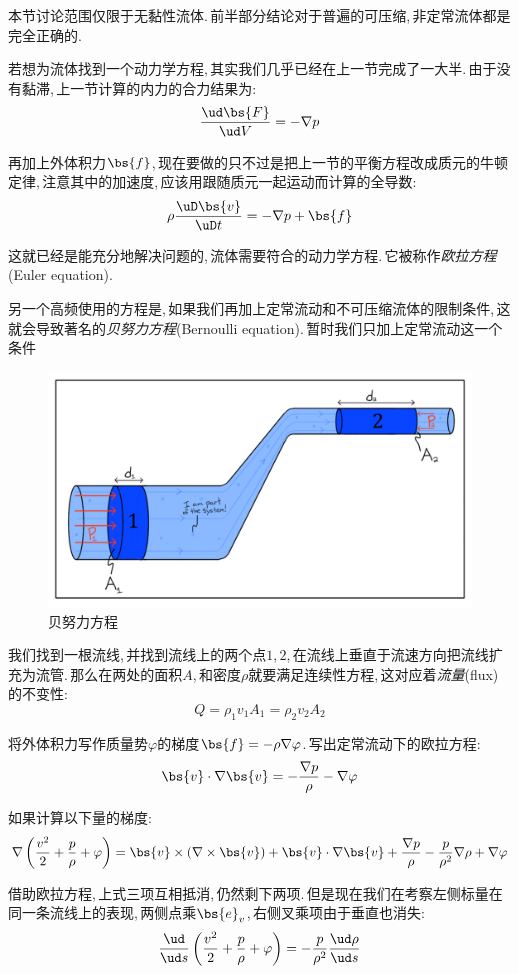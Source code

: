 本节讨论范围仅限于无黏性流体.\,前半部分结论对于普遍的可压缩,\,非定常流体都是完全正确的.

若想为流体找到一个动力学方程,\,其实我们几乎已经在上一节完成了一大半.\,由于没有黏滞,\,上一节计算的内力的合力结果为:
\[\frac{\ud\bs{F}}{\ud V}=-\nabla p\]

再加上外体积力$\bs{f}$,\,现在要做的只不过是把上一节的平衡方程改成质元的牛顿定律,\,注意其中的加速度,\,应该用跟随质元一起运动而计算的全导数:
\[\rho \frac{\uD \bs{v}}{\uD t}=-\nabla p+\bs{f}\]

这就已经是能充分地解决问题的,\,流体需要符合的动力学方程.\,它被称作\emph{欧拉方程}(Euler equation).

另一个高频使用的方程是,\,如果我们再加上定常流动和不可压缩流体的限制条件,\,这就会导致著名的\emph{贝努力方程}(Bernoulli equation).\,暂时我们只加上定常流动这一个条件

\begin{figure}[H]
\centering
\includegraphics[width=14cm]{image/6-8-2.png}
\caption{贝努力方程}
\end{figure}

我们找到一根流线,\,并找到流线上的两个点$1$,\,$2$,\,在流线上垂直于流速方向把流线扩充为流管.\,那么在两处的面积$A$,\,和密度$\rho$就要满足连续性方程,\,这对应着\emph{流量}(flux)的不变性:
\[Q=\rho_1v_1A_1=\rho_2v_2A_2\]


将外体积力写作质量势$\varphi$的梯度$\bs{f}=-\rho\nabla \varphi$.\,写出定常流动下的欧拉方程:
\[\bs{v}\cdot\nabla \bs{v}=-\frac{\nabla p}{\rho}-\nabla \varphi\]

如果计算以下量的梯度:
\[\nabla\left(\frac{v^2}{2}+\frac{p}{\rho}+\varphi\right)=\bs{v}\times(\nabla \times\bs{v})+\bs{v}\cdot\nabla \bs{v}+\frac{\nabla p}{\rho}-\frac{p}{\rho^2}\nabla\rho+\nabla \varphi\]

借助欧拉方程,\,上式三项互相抵消,\,仍然剩下两项.\,但是现在我们在考察左侧标量在同一条流线上的表现,\,两侧点乘$\bs{e}_v$,\,右侧叉乘项由于垂直也消失:
\[\frac{\ud}{\ud s}\left(\frac{v^2}{2}+\frac{p}{\rho}+\varphi\right)=-\frac{p}{\rho^2}\frac{\ud \rho}{\ud s}\]

